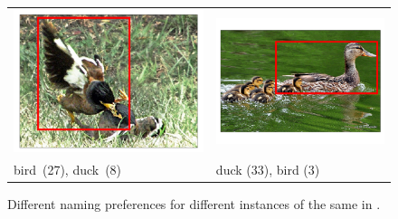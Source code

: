 \begin{figure}[t]
	\centering
	\small
	\begin{tabular}{p{3cm}p{3cm}}
		\centering
		\includegraphics[scale=0.15]{images/2327551_2960743_seed_ambiguous.png} &
		\includegraphics[scale=0.15]{images/2358126_805887_singleton_obj.png}\\
		bird\ (27),  duck\ (8) & duck (33), bird (3)\\
	\end{tabular}
	\caption{Different naming preferences for different instances of the same \category {} in \mn.\label{fig:duck}}
\end{figure}


